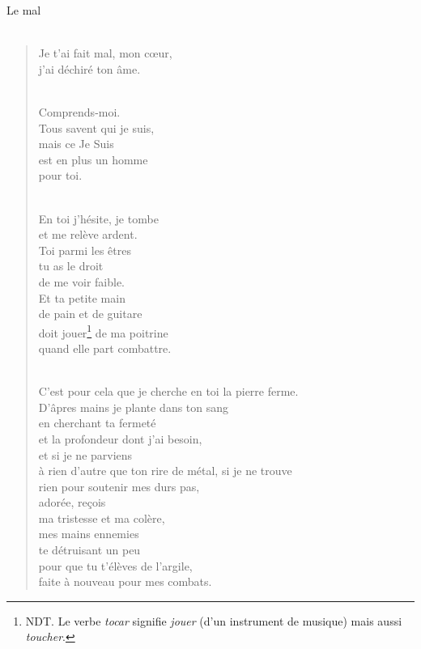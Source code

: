 \documentclass[11pt,a4paper]{book}
\begin{document}
\newpage

{\huge Le mal} \\ \\

\begin{verse}
Je t'ai fait mal, mon c{\oe}ur, \\
j'ai déchiré ton âme. \\ \

Comprends-moi. \\
Tous savent qui je suis, \\
mais ce Je Suis \\
est en plus un homme \\
pour toi. \\ \

En toi j'hésite, je tombe \\
et me relève ardent. \\
Toi parmi les êtres \\
tu as le droit \\
de me voir faible. \\
Et ta petite main \\
de pain et de guitare \\
doit jouer\footnote{NDT. Le verbe {\em tocar} signifie
{\em jouer} (d'un instrument de musique) mais aussi {\em toucher}.} de ma poitrine \\
quand elle part combattre. \\ \

C'est pour cela que je cherche en toi la pierre ferme. \\
D'âpres mains je plante dans ton sang \\
en cherchant ta fermeté \\
et la profondeur dont j'ai besoin, \\
et si je ne parviens \\
à rien d'autre que ton rire de métal, si je ne trouve \\
rien pour soutenir mes durs pas, \\
adorée, re\c{c}ois \\
ma tristesse et ma colère, \\
mes mains ennemies \\
te détruisant un peu \\
pour que tu t'élèves de l'argile, \\
faite à nouveau pour mes combats.
\end{verse}

\newpage
\end{document}
